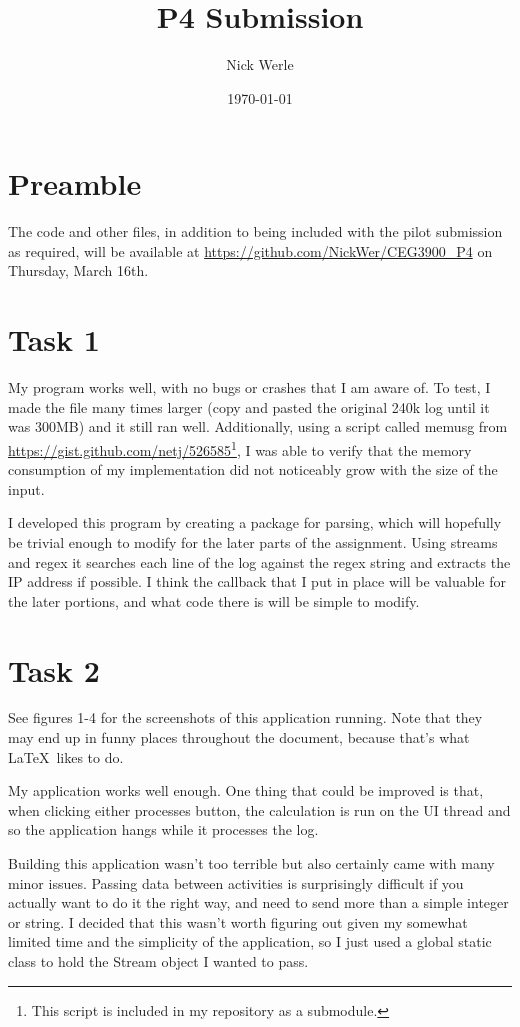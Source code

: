 \documentclass[11pt]{article}
\title{P4 Submission}
\author{Nick Werle}
\date{\today}
\begin{document}
	\maketitle
	\section{Preamble}
	The code and other files, in addition to being included with the pilot submission as required, will be available at \url{https://github.com/NickWer/CEG3900_P4} on Thursday, March 16th.
	\section{Task 1}
	My program works well, with no bugs or crashes that I am aware of. To test, I made the file many times larger (copy and pasted the original 240k log until it was 300MB) and it still ran well. Additionally, using a script called memusg from \url{https://gist.github.com/netj/526585}\footnote{This script is included in my repository as a submodule.}, I was able to verify that the memory consumption of my implementation did not noticeably grow with the size of the input.
	
	I developed this program by creating a package for parsing, which will hopefully be trivial enough to modify for the later parts of the assignment. Using streams and regex it searches each line of the log against the regex string and extracts the IP address if possible. I think the callback that I put in place will be valuable for the later portions, and what code there is will be simple to modify.
	\section{Task 2}
	See figures 1-4 for the screenshots of this application running. Note that they may end up in funny places throughout the document, because that's what \LaTeX\ likes to do.
	
	My application works well enough. One thing that could be improved is that, when clicking either processes button, the calculation is run on the UI thread and so the application hangs while it processes the log.
	
	Building this application wasn't too terrible but also certainly came with many minor issues. Passing data between activities is surprisingly difficult if you actually want to do it the right way, and need to send more than a simple integer or string. I decided that this wasn't worth figuring out given my somewhat limited time and the simplicity of the application, so I just used a global static class to hold the Stream object I wanted to pass.
	
\end{document}
